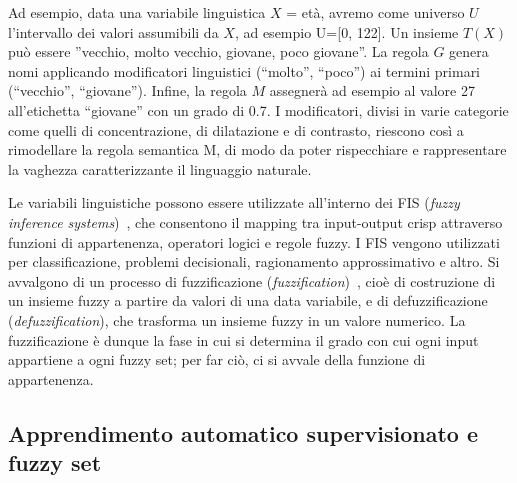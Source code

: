 \documentclass[11pt,  oneside, openany]{book}
\begin{document}
Ad esempio, data una variabile linguistica $X$ = età, avremo come universo $U$ l'intervallo dei valori assumibili da $X$, ad esempio U=[0, 122]. Un insieme $T(X)$ può essere ''vecchio, molto vecchio, giovane, poco giovane''. La regola $G$ genera nomi applicando modificatori linguistici (``molto'', ``poco'') ai termini primari (``vecchio'', ``giovane''). Infine, la regola $M$ assegnerà ad esempio al valore 27 all'etichetta ``giovane'' con un grado di 0.7. I modificatori, divisi in varie categorie come quelli di concentrazione, di dilatazione e di contrasto, riescono così a rimodellare la regola semantica M, di modo da poter rispecchiare e rappresentare la vaghezza caratterizzante il linguaggio naturale. 

Le variabili linguistiche possono essere utilizzate all'interno dei FIS (\textit{fuzzy inference systems})~\cite{fis}, che consentono il mapping tra input-output crisp attraverso funzioni di appartenenza, operatori logici e regole fuzzy. I FIS vengono utilizzati per classificazione, problemi decisionali, ragionamento approssimativo e altro. Si avvalgono di un processo di fuzzificazione (\textit{fuzzification})~\cite{fuzzific}, cioè di costruzione di un insieme fuzzy a partire da valori di una data variabile, e di defuzzificazione (\textit{defuzzification}), che trasforma un insieme fuzzy in un valore numerico. La fuzzificazione è dunque la fase in cui si determina il grado con cui ogni input appartiene a ogni fuzzy set; per far ciò, ci si avvale della funzione di appartenenza. 

\subsection{Apprendimento automatico supervisionato e fuzzy set}
\end{document}
